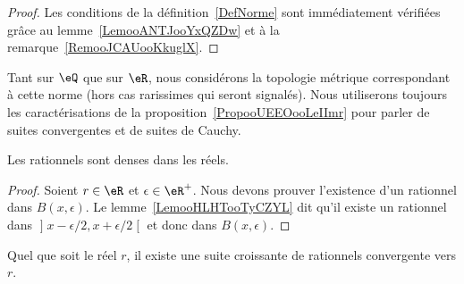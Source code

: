 \begin{proof}
    Les conditions de la définition~\ref{DefNorme} sont immédiatement vérifiées grâce au lemme~\ref{LemooANTJooYxQZDw} et à la remarque~\ref{RemooJCAUooKkuglX}.
\end{proof}

\begin{normaltext}      \label{ooLCMFooQjMaxV}
Tant sur \( \eQ\) que sur \( \eR\), nous considérons la topologie métrique correspondant à cette norme (hors cas rarissimes qui seront signalés). Nous utiliserons toujours les caractérisations de la proposition~\ref{PropooUEEOooLeIImr} pour parler de suites convergentes et de suites de Cauchy.
\end{normaltext}

\begin{proposition}     \label{PropooUHNZooOUYIkn}
    Les rationnels sont denses dans les réels.
\end{proposition}

\begin{proof}
    Soient \( r\in \eR\) et \( \epsilon\in \eR^+\). Nous devons prouver l'existence d'un rationnel dans \( B(x,\epsilon)\). Le lemme~\ref{LemooHLHTooTyCZYL} dit qu'il existe un rationnel dans \( \mathopen] x-\epsilon/2 , x+\epsilon/2 \mathclose[\) et donc dans \( B(x,\epsilon)\).
\end{proof}


\begin{proposition} \label{PropSLCUooUFgiSR}
    Quel que soit le réel \( r\), il existe une suite croissante de rationnels convergente vers \( r\).
\end{proposition}

